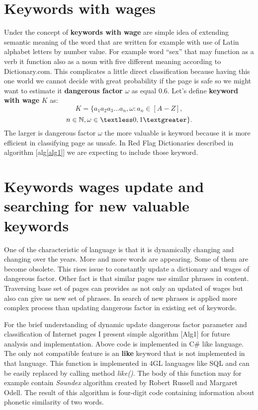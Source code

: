 \documentclass[9pt,a4paper]{extarticle}
\begin{document}
\begin{multicols}{2}
\section{Keywords with wages}
Under the concept of \textbf{keywords with wage} are simple idea of extending semantic meaning of the word that are written for example with use of Latin alphabet letters by number value. For example word
``sex'' that may function as a verb it function also as a noun with five different meaning according to Dictionary.com\cite{noauthor_dictionary.com_2018}. This complicates a little direct classification because having this one world we cannot decide with great probability if the page is safe so we might want to estimate it \textbf{dangerous factor} \(\omega\) as equal 0.6. Let's define \textbf{keyword with wage} \(K\) as:
$$
K = \{a_1a_2a_3...a_n, \omega : a_n \in [A-Z], 
$$
$$
n \in \mathbb{N}, \omega \in \textless0,1\textgreater\}.
$$
The larger is dangerous factor \(\omega\) the more valuable is keyword because it is more efficient in classifying page as unsafe. In Red Flag Dictionaries described in algorithm [alg\ref{alg1}] we are expecting to include those keyword. 

\section{Keywords wages update and searching for new valuable keywords}
One of the characteristic of language is that it is dynamically changing and changing over the years.  More and more words are appearing. Some of them are become obsolete. This rises issue to constantly update a dictionary and wages of dangerous factor. Other fact is that similar pages use similar phrases in content. Traversing base set of pages can provides as not only an updated of wages but also can give us new set of phrases. In search of new phrases is applied more complex process than updating dangerous factor in existing set of keywords.

For the brief understanding of dynamic update dangerous factor parameter and classification of Internet pages I present simple algorithm [Alg1] for future analysis and implementation. Above code is implemented in C\# like language. The only not compatible feature is an \textbf{like} keyword that is not implemented in that language. This function is implemented in 4GL languages like SQL and can be easily replaced by calling method \textit{like()}. The body of this function may for example contain \textit{Soundex} algorithm created by Robert Russell and Margaret Odell\cite{donald_e._knuth_art_2002}. The result of this algorithm is four-digit code containing information about phonetic similarity of two words.


\end{multicols}
\end{document}
